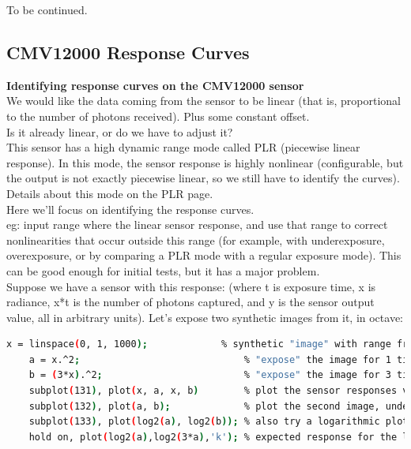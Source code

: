 To be continued. 








\subsection{CMV12000 Response Curves}

\textbf{Identifying response curves on the CMV12000 sensor }\\

We would like the data coming from the sensor to be linear (that is, proportional to the number of photons received). Plus some constant offset.\\

Is it already linear, or do we have to adjust it?\\

This sensor has a high dynamic range mode called PLR (piecewise linear response). In this mode, the sensor response is highly nonlinear (configurable, but the output is not exactly piecewise linear, so we still have to identify the curves). Details about this mode on the PLR page.\\

Here we'll focus on identifying the response curves.\\

eg: input range where the linear sensor response, and use that range to correct nonlinearities that occur outside this range (for example, with underexposure, overexposure, or by comparing a PLR mode with a regular exposure mode). This can be good enough for initial tests, but it has a major problem. \\

Suppose we have a sensor with this response: (where t is exposure time, x is radiance, x*t is the number of photons captured, and y is the sensor output value, all in arbitrary units). Let's expose two synthetic images from it, in octave: 

\begin{lstlisting}[language=bash,morekeywords=$,keywordstyle=\bfseries,frame=none,xleftmargin=.25in,belowskip=2em, aboveskip=2em]
    x = linspace(0, 1, 1000);             % synthetic "image" with range from 0 to 1 (black to white)
    a = x.^2;                             % "expose" the image for 1 time unit
    b = (3*x).^2;                         % "expose" the image for 3 time units
    subplot(131), plot(x, a, x, b)        % plot the sensor responses vs input signal (radiance)
    subplot(132), plot(a, b);             % plot the second image, under the assumption that first one might be linear
    subplot(133), plot(log2(a), log2(b)); % also try a logarithmic plot
    hold on, plot(log2(a),log2(3*a),'k'); % expected response for the logarithmic plot
\end{lstlisting}

